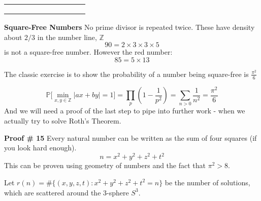 \documentclass[12pt]{article}
\begin{document}
\begin{tabular}{rrrrrrrrrr}
{\color{red!80!white}{70}} & {\color{red!80!white}{71}} & {\color{blue!80!white}{72}} & {\color{red!80!white}{73}} & {\color{red!80!white}{74}} & {\color{blue!80!white}{75}} & {\color{blue!80!white}{76}} & {\color{red!80!white}{77}} & {\color{red!80!white}{78}} & {\color{red!80!white}{79}}\\ 
{\color{blue!80!white}{80}} & {\color{blue!80!white}{81}} & {\color{red!80!white}{82}} & {\color{red!80!white}{83}} & {\color{blue!80!white}{84}} & {\color{red!80!white}{85}} & {\color{red!80!white}{86}} & {\color{red!80!white}{87}} & {\color{blue!80!white}{88}} & {\color{red!80!white}{89}}\\ 
{\color{blue!80!white}{90}} & {\color{red!80!white}{91}} & {\color{blue!80!white}{92}} & {\color{red!80!white}{93}} & {\color{red!80!white}{94}} & {\color{red!80!white}{95}} & {\color{blue!80!white}{96}} & {\color{red!80!white}{97}} & {\color{blue!80!white}{98}} & {\color{blue!80!white}{99}}\end{tabular} \newline \newline

\noindent \textbf{Square-Free Numbers}
No prime divisor is repeated twice.  \newline These have density about $2/3$ in the number line, $\mathbb{Z}$
$$ 90 = 2 \times 3 \times 3 \times 5 $$
is not a square-free number.  However the red number:
$$ 85 = 5 \times 13 $$
\newpage

\noindent The classic exercise is to show the probability of a number being square-free is $\frac{\pi^2}{6}$

$$ \mathbb{P}\big[ \min_{x,y \in \mathbb{Z}} |ax+by| = 1\big]
= \prod_{p} \left( 1 - \frac{1}{p^2}\right)
= \sum_{n > 0} \frac{1}{n^2} = \frac{\pi^2}{6} $$
And we will need a proof of the last step to pipe into further work - when we actually try to solve Roth's Theorem. \newline \newline

\noindent \textbf{Proof \# 15} Every natural number can be written as the sum of four squares (if you look hard enough).
  $$ n = x^2 + y^2 + z^2 + t^2 $$
This can be proven using geometry of numbers and the fact that $\pi^2 > 8$. \newline

\noindent Let $r(n) = \# \{ (x,y,z,t): x^2 + y^2 + z^2 + t^2 = n \}$ be the number of solutions, which are scattered around the 3-sphere $S^3$.

\newpage
\end{document}
